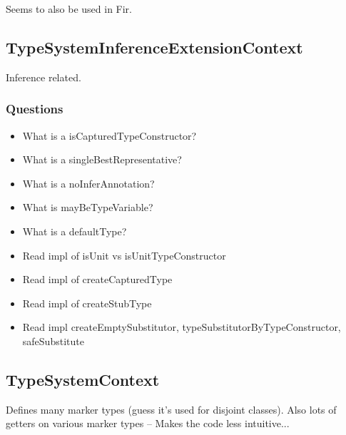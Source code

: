 \documentclass{article}
\begin{document}
Seems to also be used in Fir.

\subsection{TypeSystemInferenceExtensionContext}

Inference related.

\subsubsection{Questions}
\begin{itemize}
    \item What is a isCapturedTypeConstructor?
    \item What is a singleBestRepresentative?
    \item What is a noInferAnnotation?
    \item What is mayBeTypeVariable?
    \item What is a defaultType?
    \item Read impl of isUnit vs isUnitTypeConstructor
    \item Read impl of createCapturedType
    \item Read impl of createStubType
    \item Read impl createEmptySubstitutor, typeSubstitutorByTypeConstructor, safeSubstitute
\end{itemize}

\subsection{TypeSystemContext}

Defines many marker types (guess it's used for disjoint classes). Also lots of getters on various marker types -- Makes the code less intuitive...
\end{document}
